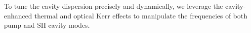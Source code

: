 \documentclass[a4paper,8pt,hyperref, twocolumn]{article}
\begin{document}
To tune the cavity dispersion precisely and dynamically, we leverage the cavity-enhanced thermal and optical Kerr effects to manipulate the frequencies of both pump and SH cavity modes. 
\end{document}
